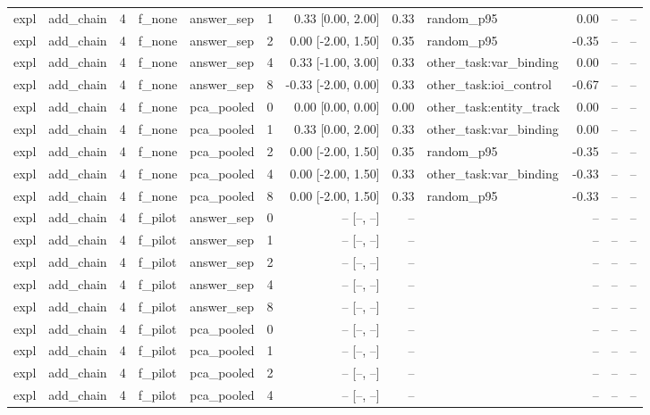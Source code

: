 \begin{tabular}{llrllrrrlrrr}
expl & add\_chain & 4 & f\_none & answer\_sep & 1 & 0.33 [0.00, 2.00] & 0.33 & random\_p95 & 0.00 & -- & -- \\
expl & add\_chain & 4 & f\_none & answer\_sep & 2 & 0.00 [-2.00, 1.50] & 0.35 & random\_p95 & -0.35 & -- & -- \\
expl & add\_chain & 4 & f\_none & answer\_sep & 4 & 0.33 [-1.00, 3.00] & 0.33 & other\_task:var\_binding & 0.00 & -- & -- \\
expl & add\_chain & 4 & f\_none & answer\_sep & 8 & -0.33 [-2.00, 0.00] & 0.33 & other\_task:ioi\_control & -0.67 & -- & -- \\
expl & add\_chain & 4 & f\_none & pca\_pooled & 0 & 0.00 [0.00, 0.00] & 0.00 & other\_task:entity\_track & 0.00 & -- & -- \\
expl & add\_chain & 4 & f\_none & pca\_pooled & 1 & 0.33 [0.00, 2.00] & 0.33 & other\_task:var\_binding & 0.00 & -- & -- \\
expl & add\_chain & 4 & f\_none & pca\_pooled & 2 & 0.00 [-2.00, 1.50] & 0.35 & random\_p95 & -0.35 & -- & -- \\
expl & add\_chain & 4 & f\_none & pca\_pooled & 4 & 0.00 [-2.00, 1.50] & 0.33 & other\_task:var\_binding & -0.33 & -- & -- \\
expl & add\_chain & 4 & f\_none & pca\_pooled & 8 & 0.00 [-2.00, 1.50] & 0.33 & random\_p95 & -0.33 & -- & -- \\
expl & add\_chain & 4 & f\_pilot & answer\_sep & 0 & -- [--, --] & -- &  & -- & -- & -- \\
expl & add\_chain & 4 & f\_pilot & answer\_sep & 1 & -- [--, --] & -- &  & -- & -- & -- \\
expl & add\_chain & 4 & f\_pilot & answer\_sep & 2 & -- [--, --] & -- &  & -- & -- & -- \\
expl & add\_chain & 4 & f\_pilot & answer\_sep & 4 & -- [--, --] & -- &  & -- & -- & -- \\
expl & add\_chain & 4 & f\_pilot & answer\_sep & 8 & -- [--, --] & -- &  & -- & -- & -- \\
expl & add\_chain & 4 & f\_pilot & pca\_pooled & 0 & -- [--, --] & -- &  & -- & -- & -- \\
expl & add\_chain & 4 & f\_pilot & pca\_pooled & 1 & -- [--, --] & -- &  & -- & -- & -- \\
expl & add\_chain & 4 & f\_pilot & pca\_pooled & 2 & -- [--, --] & -- &  & -- & -- & -- \\
expl & add\_chain & 4 & f\_pilot & pca\_pooled & 4 & -- [--, --] & -- &  & -- & -- & -- \\

\end{tabular}

